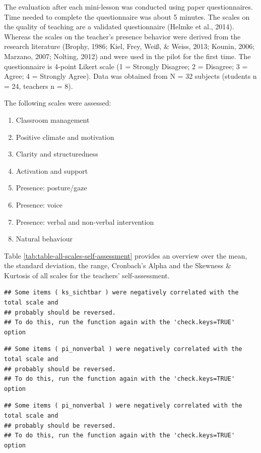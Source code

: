 \documentclass[
  english,
  man,floatsintext]{apa6}
\providecommand{\tightlist}{%
  \setlength{\itemsep}{0pt}\setlength{\parskip}{0pt}}
\begin{document}
The evaluation after each mini-lesson was conducted using paper questionnaires. Time needed to complete the questionnaire was about 5 minutes.
The scales on the quality of teaching are a validated questionnaire (Helmke et al., 2014). Whereas the scales on the teacher's presence behavior were derived from the research literature (Brophy, 1986; Kiel, Frey, Weiß, \& Weiss, 2013; Kounin, 2006; Marzano, 2007; Nolting, 2012) and were used in the pilot for the first time. The questionnaire is 4-point Likert scale (1 = Strongly Disagree; 2 = Disagree; 3 = Agree; 4 = Strongly Agree). Data was obtained from N = 32 subjects (students n = 24, teachers n = 8).

The following scales were assessed:

\begin{enumerate}
\def\labelenumi{(\arabic{enumi})}
\tightlist
\item
  Classroom management
\item
  Positive climate and motivation
\item
  Clarity and structuredness
\item
  Activation and support
\item
  Presence: posture/gaze
\item
  Presence: voice
\item
  Presence: verbal and non-verbal intervention
\item
  Natural behaviour
\end{enumerate}

Table \ref{tab:table-all-scales-self-assessment} provides an overview over the mean, the standard deviation, the range, Cronbach's Alpha and the Skewness \& Kurtosis of all scales for the teachers' self-assessment.

\begin{verbatim}
## Some items ( ks_sichtbar ) were negatively correlated with the total scale and 
## probably should be reversed.  
## To do this, run the function again with the 'check.keys=TRUE' option
\end{verbatim}

\begin{verbatim}
## Some items ( pi_nonverbal ) were negatively correlated with the total scale and 
## probably should be reversed.  
## To do this, run the function again with the 'check.keys=TRUE' option
\end{verbatim}

\begin{verbatim}
## Some items ( pi_nonverbal ) were negatively correlated with the total scale and 
## probably should be reversed.  
## To do this, run the function again with the 'check.keys=TRUE' option
\end{verbatim}
\end{document}
